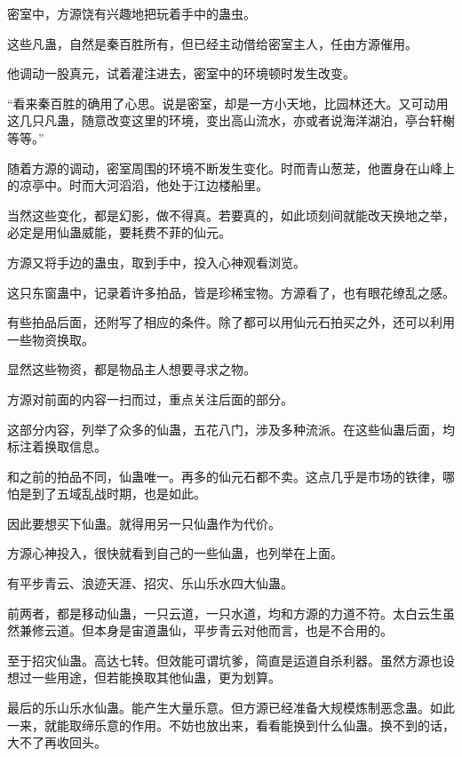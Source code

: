 
\begin{this_body}



密室中，方源饶有兴趣地把玩着手中的蛊虫。

这些凡蛊，自然是秦百胜所有，但已经主动借给密室主人，任由方源催用。

他调动一股真元，试着灌注进去，密室中的环境顿时发生改变。

“看来秦百胜的确用了心思。说是密室，却是一方小天地，比园林还大。又可动用这几只凡蛊，随意改变这里的环境，变出高山流水，亦或者说海洋湖泊，亭台轩榭等等。”

随着方源的调动，密室周围的环境不断发生变化。时而青山葱茏，他置身在山峰上的凉亭中。时而大河滔滔，他处于江边楼船里。

当然这些变化，都是幻影，做不得真。若要真的，如此顷刻间就能改天换地之举，必定是用仙蛊威能，要耗费不菲的仙元。

方源又将手边的蛊虫，取到手中，投入心神观看浏览。

这只东窗蛊中，记录着许多拍品，皆是珍稀宝物。方源看了，也有眼花缭乱之感。

有些拍品后面，还附写了相应的条件。除了都可以用仙元石拍买之外，还可以利用一些物资换取。

显然这些物资，都是物品主人想要寻求之物。

方源对前面的内容一扫而过，重点关注后面的部分。

这部分内容，列举了众多的仙蛊，五花八门，涉及多种流派。在这些仙蛊后面，均标注着换取信息。

和之前的拍品不同，仙蛊唯一。再多的仙元石都不卖。这点几乎是市场的铁律，哪怕是到了五域乱战时期，也是如此。

因此要想买下仙蛊。就得用另一只仙蛊作为代价。

方源心神投入，很快就看到自己的一些仙蛊，也列举在上面。

有平步青云、浪迹天涯、招灾、乐山乐水四大仙蛊。

前两者，都是移动仙蛊，一只云道，一只水道，均和方源的力道不符。太白云生虽然兼修云道。但本身是宙道蛊仙，平步青云对他而言，也是不合用的。

至于招灾仙蛊。高达七转。但效能可谓坑爹，简直是运道自杀利器。虽然方源也设想过一些用途，但若能换取其他仙蛊，更为划算。

最后的乐山乐水仙蛊。能产生大量乐意。但方源已经准备大规模炼制恶念蛊。如此一来，就能取缔乐意的作用。不妨也放出来，看看能换到什么仙蛊。换不到的话，大不了再收回头。


\end{this_body}

